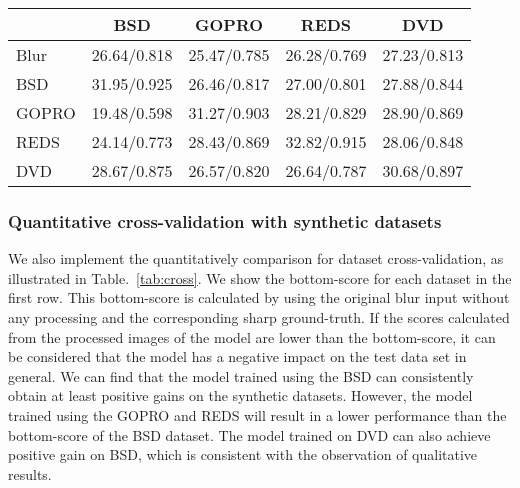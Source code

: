 \documentclass[twocolumn]{svjour3}          \smartqed  \usepackage{graphicx}
\begin{document}
\begin{table*}[ht]
\caption{Dataset cross-validation in terms of PSNR/SSIM. We choose the 2ms16ms setting for the BSD dataset. The setting of ESTRNN is (B15C80).}
  \label{tab:cross}
  \setlength{\tabcolsep}{14pt}
  \centering
  \small
  \begin{tabular}{lcccc}
    \toprule
     & BSD & GOPRO & REDS & DVD\\
    \midrule
    Blur & 26.64/0.818 & 25.47/0.785 & 26.28/0.769 & 27.23/0.813\\
    \midrule
    BSD & 31.95/0.925 & 26.46/0.817 & 27.00/0.801 & 27.88/0.844 \\
    GOPRO & 19.48/0.598 & 31.27/0.903 & 28.21/0.829 & 28.90/0.869\\
    REDS & 24.14/0.773 & 28.43/0.869 & 32.82/0.915 & 28.06/0.848\\
    DVD & 28.67/0.875 & 26.57/0.820 & 26.64/0.787 & 30.68/0.897\\
    \bottomrule
  \end{tabular}
\end{table*}

\subsubsection{Quantitative cross-validation with synthetic datasets}
We also implement the quantitatively comparison for dataset cross-validation, as illustrated in Table.~\ref{tab:cross}. We show the bottom-score for each dataset in the first row. This bottom-score is calculated by using the original blur input without any processing and the corresponding sharp ground-truth. If the scores calculated from the processed images of the model are lower than the bottom-score, it can be considered that the model has a negative impact on the test data set in general. We can find that the model trained using the BSD can consistently obtain at least positive gains on the synthetic datasets. However, the model trained using the GOPRO and REDS will result in a lower performance than the bottom-score of the BSD dataset. The model trained on DVD can also achieve positive gain on BSD, which is consistent with the observation of qualitative results.

\begin{figure*}[!ht]
	\centering
{}
	\hfil
	\caption{Cross-validation between BSD and high-fps synthetic dataset.}
	\label{fig:cross_bsd_highfps}
\end{figure*}
\end{document}
